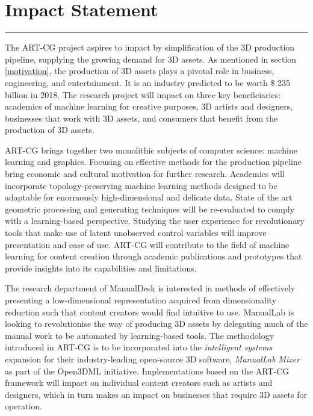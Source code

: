 \documentclass[a4paper, 11pt, onecolumn]{article} %
\numberwithin{equation}{section} %
\numberwithin{figure}{section} %
\numberwithin{table}{section} %
\begin{document}
\section*{Impact Statement}
\hrule\vspace{0.5em}

The ART-CG project aspires to impact by simplification of the 3D production pipeline, supplying the growing demand for 3D assets. As mentioned in section \ref{motivation}, the production of 3D assets plays a pivotal role in business, engineering, and entertainment. It is an industry predicted to be worth \$ 235 billion in 2018. The research project will impact on three key beneficiaries: academics of machine learning for creative purposes, 3D artists and designers, businesses that work with 3D assets, and consumers that benefit from the production of 3D assets.

ART-CG brings together two monolithic subjects of computer science: machine learning and graphics. Focusing on effective methods for the production pipeline bring economic and cultural motivation for further research. Academics will incorporate topology-preserving machine learning methods designed to be adaptable for enormously high-dimensional and delicate data. State of the art geometric processing and generating techniques will be re-evaluated to comply with a learning-based perspective. Studying the user experience for revolutionary tools that make use of latent unobserved control variables will improve presentation and ease of use. ART-CG will contribute to the field of machine learning for content creation through academic publications and prototypes that provide insights into its capabilities and limitations.

The research department of ManualDesk is interested in methods of effectively presenting a low-dimensional representation acquired from dimensionality reduction such that content creators would find intuitive to use.
ManualLab is looking to revolutionise the way of producing 3D assets by delegating much of the manual work to be automated by learning-based tools. The methodology introduced in ART-CG is to be incorporated into the \textit{intelligent systems} expansion for their industry-leading open-source 3D software, \textit{ManualLab Mixer} as part of the Open3DML initiative. Implementations based on the ART-CG framework will impact on individual content creators such as artists and designers, which in turn makes an impact on businesses that require 3D assets for operation.

\end{document}
